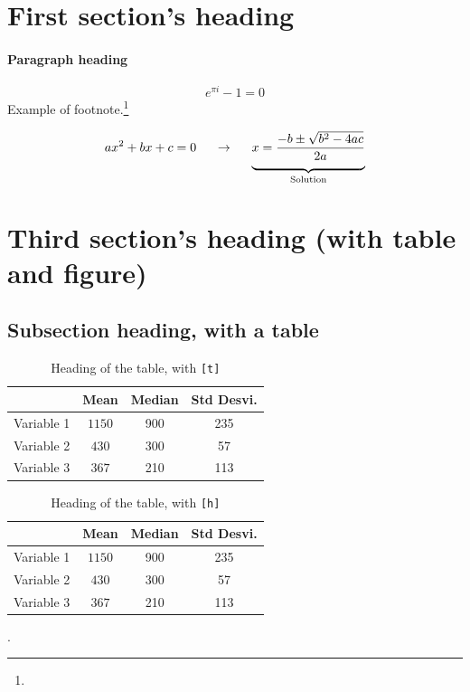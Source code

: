 \documentclass[12pt]{../bppaper}
\begin{document}
\section{First section's heading}

\blindtext

\paragraph{Paragraph heading}
\blindtext
$$e^{\pi i} - 1 = 0$$
\blindtext Example of footnote.\footnote{\blindtext}
\begin{equation}
    ax^2 +b x + c = 0 \so \llave{x = \dfrac{-b \pm \sqrt{b^2 - 4ac}}{2a}}{Solution}
\end{equation}

\section{Third section's heading (with table and figure)}

\blindtext

\subsection{Subsection heading, with a table}

\blindtext
\begin{table}[t]
\centering
\caption{Heading of the table, with \texttt{[t]}}
\begin{tabular}{cccc} \toprule
    & Mean & Median & Std Desvi.\\ \midrule
    Variable 1 & $1150$ & 900 & 235 \\ 
    Variable 2 & $430$ & 300 & 57 \\ 
    Variable 3 & $367$ & 210 & 113 \\ \bottomrule
\end{tabular}
\end{table}
\blindtext

\blindtext
\begin{table}[h]
\centering
\caption{Heading of the table, with \texttt{[h]}}
\begin{tabular}{cccc} \toprule
    & Mean & Median & Std Desvi.\\ \midrule
    Variable 1 & $1150$ & 900 & 235 \\ 
    Variable 2 & $430$ & 300 & 57 \\ 
    Variable 3 & $367$ & 210 & 113 \\ \bottomrule
\end{tabular}\par
\end{table}
\cite{lesk:1977}.
\blindtext
\end{document}
